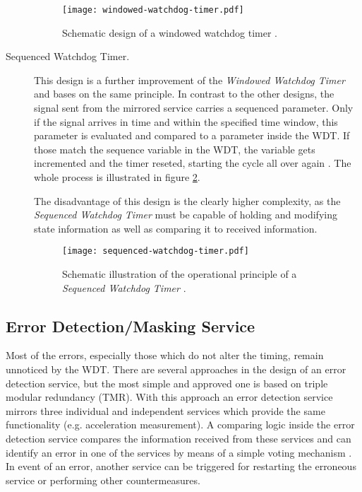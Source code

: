 \begin{description}
\begin{figure}[!htbp]
\centering
\texttt{[image: windowed-watchdog-timer.pdf]}
\caption{Schematic design of a windowed watchdog timer \cite{elattar2007}.}
\label{fig:windowed-watchdog-timer}
\end{figure}

\item [Sequenced Watchdog Timer.] 
This design is a further improvement of the \emph{Windowed Watchdog Timer} and bases on the same principle. In contrast to the other designs, the signal sent from the mirrored service carries a sequenced parameter. Only if the signal arrives in time and within the specified time window, this parameter is evaluated and compared to a parameter inside the WDT. If those match the sequence variable in the WDT, the variable gets incremented and the timer reseted, starting the cycle all over again \cite{elattar2007}. The whole process is illustrated in figure \ref{fig:sequenced-watchdog-timer}.

The disadvantage of this design is the clearly higher complexity, as the \emph{Sequenced Watchdog Timer} must be capable of holding and modifying state information as well as comparing it to received information.

\begin{figure}[!htbp]
\centering
\texttt{[image: sequenced-watchdog-timer.pdf]}
\caption{Schematic illustration of the operational principle of a \emph{Sequenced Watchdog Timer} \cite{elattar2007}.}
\label{fig:sequenced-watchdog-timer}
\end{figure}

\end{description}






\subsection{Error Detection/Masking Service}
\label{sec:error-detection-service}

Most of the errors, especially those which do not alter the timing, remain unnoticed by the WDT. There are several approaches in the design of an error detection service, but the most simple and approved one is based on triple modular redundancy (TMR). With this approach an error detection service mirrors three individual and independent services which provide the same functionality (e.g. acceleration measurement). A comparing logic inside the error detection service compares the information received from these services and can identify an error in one of the services by means of a simple voting mechanism \cite{wiki_tmr}. In event of an error, another service can be triggered for restarting the erroneous service or performing other countermeasures.

